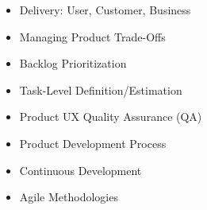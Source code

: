 
  \begin{itemize}
    \setlength\itemsep{-0.3em}
    \item Delivery: User, Customer, Business
    \item Managing Product Trade-Offs 
    \item Backlog Prioritization
    \item Task-Level Definition/Estimation
    \item Product UX Quality Assurance (QA)
    \item Product Development Process
    \item Continuous Development
    \item Agile Methodologies
  \end{itemize}

